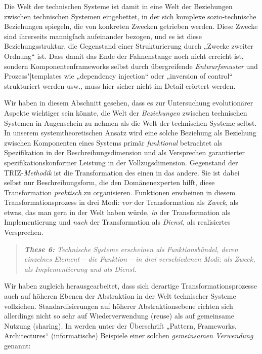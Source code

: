 \documentclass[11pt,a4paper]{article}
\begin{document}
Die Welt der technischen Systeme ist damit in eine Welt der Beziehungen
zwischen technischen Systemen eingebettet, in der sich komplexe
sozio-technische Beziehungen spiegeln, die von konkreten Zwecken getrieben
werden. Diese Zwecke sind ihrerseits mannigfach aufeinander bezogen, und es
ist diese Beziehungsstruktur, die Gegenstand einer Strukturierung durch
„Zwecke zweiter Ordnung“ ist.  Dass damit das Ende der Fahnenstange noch nicht
erreicht ist, sondern Komponentenframeworks selbst durch übergreifende
\emph{Entwurfsmuster} \cite{Gamma1995} und Prozess"|templates wie „dependency
injection“ oder „inversion of control“ strukturiert werden usw., muss hier
sicher nicht im Detail erörtert werden.

Wir haben in diesem Abschnitt gesehen, dass es zur Untersuchung evolutionärer
Aspekte wichtiger sein könnte, die Welt der \emph{Beziehungen} zwischen
technischen Systemen in Augenschein zu nehmen als die Welt der technischen
Systeme selbst. In unserem systemtheoretischen Ansatz wird eine solche
Beziehung als Beziehung zwischen Komponenten eines Systems primär
\emph{funktional} betrachtet als Spezifikation in der Beschreibungsdimension
und als Versprechen garantierter spezifikationskonformer Leistung in der
Vollzugsdimension. Gegenstand der TRIZ-\emph{Methodik} ist die Transformation
des einen in das andere. Sie ist dabei selbst nur Beschreibungsform, die den
Domänenexperten hilft, diese Transformation \emph{praktisch} zu organisieren.
Funktionen erscheinen in diesem Transformationsprozess in drei Modi:
\emph{vor} der Transformation als \emph{Zweck}, als etwas, das man gern in der
Welt haben würde, \emph{in} der Transformation als Implementierung und
\emph{nach} der Transformation als \emph{Dienst}, als realisiertes
Versprechen. 
\begin{quote}\it
  \textbf{These 6:} Technische Systeme erscheinen als Funktionsbündel, deren
  einzelnes Element -- die Funktion -- in drei verschiedenen Modi: als Zweck,
  als Implementierung und als Dienst.
\end{quote}
Wir haben zugleich herausgearbeitet, dass sich derartige
Transformationsprozesse auch auf höheren Ebenen der Abstraktion in der Welt
technischer Systeme vollziehen. Standardisierungen auf höherer
Abstraktionsebene richten sich allerdings nicht so sehr auf Wiederverwendung
(reuse) als auf gemeinsame Nutzung (sharing). In \cite[Kap.9 ]{Szyperski2002}
werden unter der Überschrift „Pattern, Frameworks, Architectures“
(informatische) Beispiele einer solchen \emph{gemeinsamen Verwendung} genannt:
\end{document}
